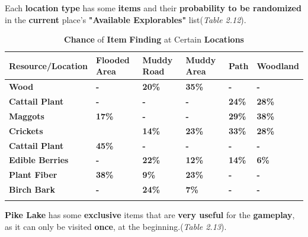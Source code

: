 			\par Each \textbf{location type} has some \textbf{items} and their \textbf{probability to be randomized} in the \textbf{current} place's \textbf{"Available Explorables"} list(\textit{Table 2.12}).
		        \begin{longtable}{|C{10em}|C{4.5em}|C{4.5em}|C{4.5em}|C{3.5em}|C{5em}}
			    \toprule
			     \textcolor[rgb]{ 1,  1,  1}{\textbf{Resource/Location}} & \textcolor[rgb]{ 1,  1,  1}{\textbf{Flooded Area}} & \textcolor[rgb]{ 1,  1,  1}{\textbf{Muddy Road}} & \textcolor[rgb]{ 1,  1,  1}{\textbf{Muddy Area}} & \textcolor[rgb]{ 1,  1,  1}{\textbf{Path}} & \textcolor[rgb]{ 1,  1,  1}{\textbf{Woodland}} \\
			    \midrule
			     \textbf{Wood} & \textbf{-} & \textbf{20\%} & \textbf{35\%} & \textbf{-} & \textbf{-} \\
			    \midrule
			     \textbf{Cattail Plant} & \textbf{-} & \textbf{-} & \textbf{-} & \textbf{24\%} & \textbf{28\%} \\
			    \midrule
			     \textbf{Maggots} & \textbf{17\%} & \textbf{-} & \textbf{-} & \textbf{29\%} &\textbf{38\%} \\
			    \midrule
			     \textbf{Crickets} & \textbf{} & \textbf{14\%} & \textbf{23\%} & \textbf{33\%} &\textbf{28\%} \\
			    \midrule
			     \textbf{Cattail Plant} & \textbf{45\%} & \textbf{-} &\textbf{-} & \textbf{-} & \textbf{-} \\
			    \midrule
			     \textbf{Edible Berries} & \textbf{-} & \textbf{22\%} & \textbf{12\%} & \textbf{14\%} & \textbf{6\%} \\
			    \midrule
			     \textbf{Plant Fiber} & \textbf{38\%} & \textbf{9\%} & \textbf{23\%} & \textbf{-} & \textbf{-} \\
			    \midrule
			     \textbf{Birch Bark} & \textbf{-} & \textbf{24\%} & \textbf{7\%} & \textbf{-} & \textbf{-} \\
			    \bottomrule	
			\caption{\textbf{Chance} of \textbf{Item} \textbf{Finding} at Certain \textbf{Locations}}
			\end{longtable}

			\par \textbf{Pike Lake} has some \textbf{exclusive} items that are \textbf{very useful} for the \textbf{gameplay}, as it can only be visited \textbf{once}, at the beginning.(\textit{Table 2.13}).


